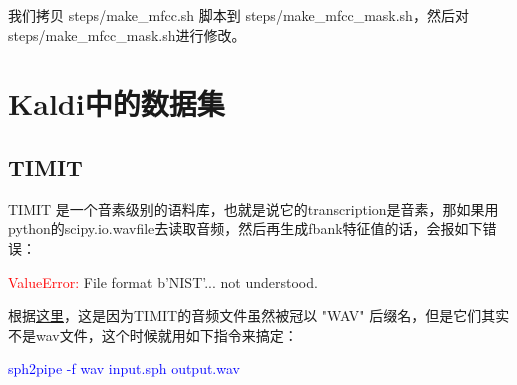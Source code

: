 我们拷贝 steps/make\_mfcc.sh 脚本到 steps/make_mfcc_mask.sh，然后对 steps/make\_mfcc\_mask.sh进行修改。


\section{Kaldi中的数据集}
\subsection{TIMIT}
TIMIT 是一个音素级别的语料库，也就是说它的transcription是音素，那如果用python的scipy.io.wavfile去读取音频，然后再生成fbank特征值的话，会报如下错误：

\textcolor{red}{ValueError: }File format b'NIST'... not understood.

根据\href{https://stackoverflow.com/questions/44748258/reading-a-wav-file-from-timit-database-in-python}{这里}，这是因为TIMIT的音频文件虽然被冠以 "WAV" 后缀名，但是它们其实不是wav文件，这个时候就用如下指令来搞定：

\textcolor{blue}{sph2pipe -f wav input.sph output.wav}

